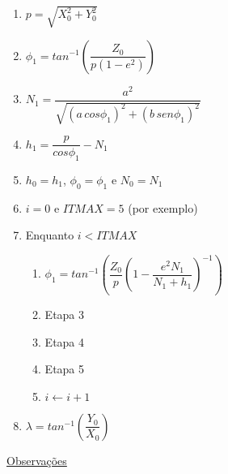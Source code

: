 \documentclass[10pt,a4paper]{article}
\begin{document}
\begin{enumerate}

\item $p = \sqrt{X_{0}^{2} + Y_{0}^{2}}$

\item $\phi_{1} = tan^{-1} \left( \dfrac{Z_{0}}{p (1 - e^{2})} 
                           \right)$

\item $N_{1} = \dfrac{a^{2}}{\sqrt{\left( a \, cos\phi_{1} \right)^{2} + 
                                   \left( b \, sen\phi_{1} \right)^{2}}}$

\item $h_{1} = \dfrac{p}{cos\phi_{1}} - N_{1}$

\item $h_{0} = h_{1}$, $\phi_{0} = \phi_{1}$ e $N_{0} = N_{1}$

\item $i = 0$ e $ITMAX = 5$ (por exemplo)

\item Enquanto $i < ITMAX$

\begin{enumerate}

\item $\phi_{1} = tan^{-1} \left( \dfrac{Z_{0}}{p} 
                           \left( 1 - \dfrac{e^{2} N_{1}}{N_{1} + h_{1}} 
                           \right)^{-1}
                           \right)$
\item Etapa 3

\item Etapa 4

\item Etapa 5

\item $i \leftarrow i + 1$

\end{enumerate}

\item $\lambda = tan^{-1} \left( \dfrac{Y_{0}}{X_{0}} \right)$

\end{enumerate}

\bigskip

\underline{Observaç\~{o}es}
\end{document}
